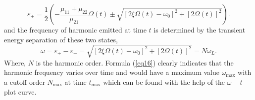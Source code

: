 \documentclass[10pt,letterpaper]{article}
\begin{document}
\begin{equation}
{\varepsilon _ \pm } = \frac{1}{2}\left( { - \frac{{{\mu _{11}} + {\mu _{22}}}}{{{\mu _{21}}}}\Omega \left( t \right) \pm \sqrt {{{\left[ {2\xi \Omega \left( t \right) - {\omega _0}} \right]}^2} + {{\left[ {2\Omega \left( t \right)} \right]}^2}} } \right).
\label{eq15}
\end{equation}
and the frequency of harmonic emitted at time $t$ is determined by the transient energy separation of these two states,
\begin{equation}
\omega  = {\varepsilon _ + } - {\varepsilon _ - } = \sqrt {{{\left[ {2\xi \Omega \left( t \right) - {\omega _0}} \right]}^2} + {{\left[ {2\Omega \left( t \right)} \right]}^2}}  = N{\omega _L}.
\label{eq16}
\end{equation}
Where, $N$ is the harmonic order. Formula (\ref{eq16}) clearly indicates that the harmonic frequency varies over time and would have a maximum value $\omega_{\textrm{max}}$ with a cutoff order $N_{\textrm{max}}$ at time $t_{\textrm{max}}$ which can be found with the help of the $\omega-t$ plot curve.
\end{document}

